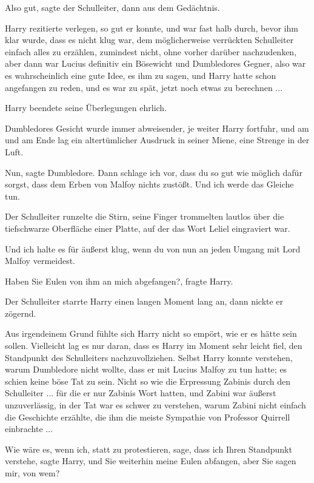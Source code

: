 \glqq{}Also gut\grqq{}, sagte der Schulleiter, \glqq{}dann aus dem
Gedächtnis.\grqq{}

Harry rezitierte verlegen, so gut er konnte, und war fast halb durch, bevor ihm
klar wurde, dass es nicht klug war, dem möglicherweise verrückten Schulleiter
einfach alles zu erzählen, zumindest nicht, ohne vorher darüber nachzudenken,
aber dann war Lucius definitiv ein Bösewicht und Dumbledores Gegner, also war es
wahrscheinlich eine gute Idee, es ihm zu sagen, und Harry hatte schon angefangen
zu reden, und es war zu spät, jetzt noch etwas zu berechnen ...

Harry beendete seine Überlegungen ehrlich.

Dumbledores Gesicht wurde immer abweisender, je weiter Harry fortfuhr, und am
und am Ende lag ein altertümlicher Ausdruck in seiner Miene, eine Strenge in der
Luft.

\glqq{}Nun\grqq{}, sagte Dumbledore. \glqq{}Dann schlage ich vor, dass du so gut
wie möglich dafür sorgst, dass dem Erben von Malfoy nichts zustößt. Und ich
werde das Gleiche tun.\grqq{}

Der Schulleiter runzelte die Stirn, seine Finger trommelten lautlos über die
tiefschwarze Oberfläche einer Platte, auf der das Wort Leliel eingraviert war.

\glqq{}Und ich halte es für äußerst klug, wenn du von nun an jeden Umgang mit
Lord Malfoy vermeidest.\grqq{}

\glqq{}Haben Sie Eulen von ihm an mich abgefangen?\grqq{}, fragte Harry.

Der Schulleiter starrte Harry einen langen Moment lang an, dann nickte er
zögernd.

Aus irgendeinem Grund fühlte sich Harry nicht so empört, wie er es hätte sein
sollen. Vielleicht lag es nur daran, dass es Harry im Moment sehr leicht fiel,
den Standpunkt des Schulleiters nachzuvollziehen. Selbst Harry konnte verstehen,
warum Dumbledore nicht wollte, dass er mit Lucius Malfoy zu tun hatte; es schien
keine böse Tat zu sein. Nicht so wie die Erpressung Zabinis durch den
Schulleiter ... für die er nur Zabinis Wort hatten, und Zabini war äußerst
unzuverlässig, in der Tat war es schwer zu verstehen, warum Zabini nicht einfach
die Geschichte erzählte, die ihm die meiste Sympathie von Professor Quirrell
einbrachte ...

\glqq{}Wie wäre es, wenn ich, statt zu protestieren, sage, dass ich Ihren
Standpunkt verstehe\grqq{}, sagte Harry, \glqq{}und Sie weiterhin meine Eulen
abfangen, aber Sie sagen mir, von wem?\grqq{}

